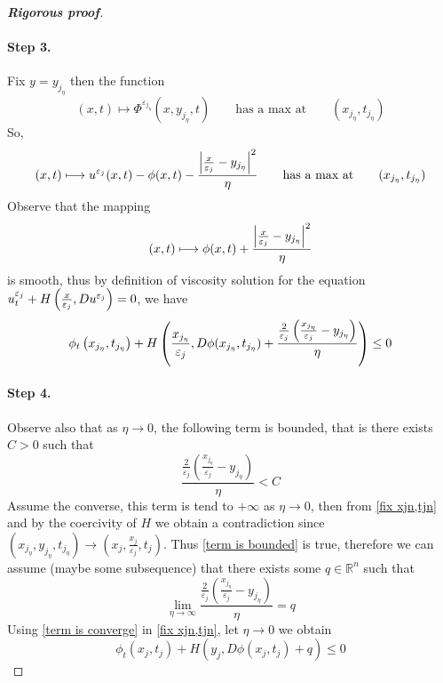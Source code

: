 \documentclass[12pt, oneside]{amsart}  	%
\begin{document}
\begin{proof}[\textbf{Rigorous proof}]
\paragraph{\textbf{Step 3.}} Fix $y=y_{j_\eta}$ then the function 
\begin{equation*}
(x,t)\mapsto \Phi^{\varepsilon_{j_\eta}}\left(x, y_{j_\eta}, t\right)\qquad\text{has a max at}\qquad \left(x_{j_\eta}, t_{j_\eta}\right)
\end{equation*}
So, 
\begin{equation*}
(x,t)\longmapsto u^{\varepsilon_j}(x,t) - \phi(x,t) - \frac{\left|\frac{x}{\varepsilon_j} - y_{j_\eta}\right|^2}{\eta}\qquad \text{has a max at}\qquad (x_{j_\eta}, t_{j_\eta})
\end{equation*}
Observe that the mapping
\begin{equation*}
(x,t)\longmapsto  \phi(x,t) + \frac{\left|\frac{x}{\varepsilon_j} - y_{j_\eta}\right|^2}{\eta}
\end{equation*}
is smooth, thus by definition of viscosity solution for the equation $u^{\varepsilon_j}_t + H\left(\frac{x}{\varepsilon_j}, Du^{\varepsilon_j}\right)=0$, we have
\begin{equation}\label{fix xjn,tjn}
\phi_t\left(x_{j_\eta}, t_{j_\eta}\right)+ H\left(\frac{x_{j_\eta}}{\varepsilon_j}, D\phi(x_{j_\eta}, t_{j_\eta})+ \frac{\frac{2}{\varepsilon_j}\left(\frac{x_{j_\eta}}{\varepsilon_j} - y_{j_\eta}\right)}{\eta}\right)\le 0
\end{equation}
\vspace*{0.2cm}


\paragraph{\textbf{Step 4.}} Observe also that as $\eta \longrightarrow 0$, the following term is bounded, that is there exists $C>0$ such that
\begin{equation}\label{term is bounded}
\frac{\frac{2}{\varepsilon_j} \left( \frac{x_{j_\eta}}{\varepsilon_j} - y_{j_\eta} \right)}{\eta} < C 
\end{equation}
Assume the converse, this term is tend to $+\infty$ as $\eta\longrightarrow 0$, then from \eqref{fix xjn,tjn} and by the coercivity of $H$ we obtain a contradiction since $(x_{j_\eta},y_{j_\eta},t_{j_\eta}) \longrightarrow \left(x_j,\frac{x_j}{\varepsilon_j},t_j\right)$. Thus \eqref{term is bounded} is true, therefore we can assume (maybe some subsequence) that there exists some $q\in \mathbb{R}^n$ such that
\begin{equation}\label{term is converge}
\lim_{\eta\longrightarrow\infty}\frac{\frac{2}{\varepsilon_j} \left( \frac{x_{j_\eta}}{\varepsilon_j} - y_{j_\eta} \right)}{\eta} =q
\end{equation}
Using \eqref{term is converge} in \eqref{fix xjn,tjn}, let $\eta\longrightarrow0$ we obtain
\begin{equation}\label{first-equation}
\phi_t(x_j,t_j) + H\left(y_j, D\phi\left(x_j,t_j\right) + q\right) \leq 0
\end{equation}
\vspace*{0.2cm}






\end{proof}
\end{document}
